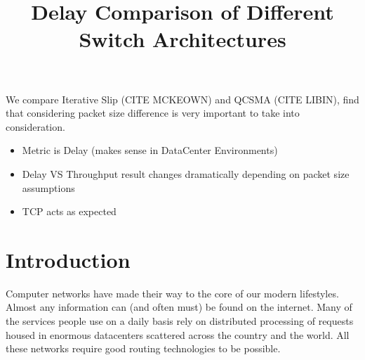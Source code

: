 \documentclass{IEEEtran}%
\begin{document}
\title{Delay Comparison of Different Switch Architectures}



\author{}






\maketitle

{\abstract
 We compare Iterative Slip (CITE MCKEOWN) and QCSMA (CITE LIBIN), find that considering packet size difference is very important to take into consideration.
\begin{itemize}
\item Metric is Delay (makes sense in DataCenter Environments)
\item Delay VS Throughput result changes dramatically depending on packet size assumptions
\item TCP acts as expected
\end{itemize}
}

\section{Introduction}
Computer networks have made their way to the core of our modern lifestyles.  Almost any information can (and often must) be found on the internet.  Many of the services people use on a daily basis rely on distributed processing of requests housed in enormous datacenters scattered across the country and the world.  All these networks require good routing technologies to be possible.
\end{document}
